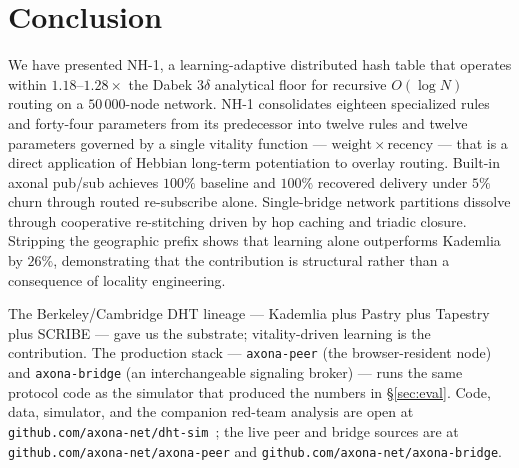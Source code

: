 \documentclass[conference]{IEEEtran}
\newcommand{\nhone}{NH-1\xspace}
\begin{document}
\section{Conclusion}
\label{sec:conclusion}

We have presented \nhone, a learning-adaptive distributed hash table
that operates within $1.18$--$1.28\times$ the Dabek $3\delta$
analytical floor for recursive $O(\log N)$ routing on a $50\,000$-node
network. \nhone consolidates eighteen specialized rules and
forty-four parameters from its predecessor into twelve rules and
twelve parameters governed by a single vitality function ---
$\mathrm{weight} \times \mathrm{recency}$ --- that is a direct
application of Hebbian long-term potentiation to overlay routing.
Built-in axonal pub/sub achieves $100\%$ baseline and $100\%$
recovered delivery under $5\%$ churn through routed re-subscribe alone.
Single-bridge network partitions dissolve through cooperative
re-stitching driven by hop caching and triadic closure. Stripping the
geographic prefix shows that learning alone outperforms Kademlia by
$26\%$, demonstrating that the contribution is structural rather than
a consequence of locality engineering.

The Berkeley/Cambridge DHT lineage --- Kademlia plus Pastry plus
Tapestry plus SCRIBE --- gave us the substrate; vitality-driven
learning is the contribution. The production stack ---
\texttt{axona-peer} (the browser-resident node) and
\texttt{axona-bridge} (an interchangeable signaling broker) ---
runs the same protocol code as the simulator that produced the
numbers in \S\ref{sec:eval}. Code, data, simulator, and the
companion red-team analysis are open at
\texttt{github.com/axona-net/dht-sim}~\cite{dhtsim2026}; the live
peer and bridge sources are at \texttt{github.com/axona-net/axona-peer}
and \texttt{github.com/axona-net/axona-bridge}.



\end{document}
